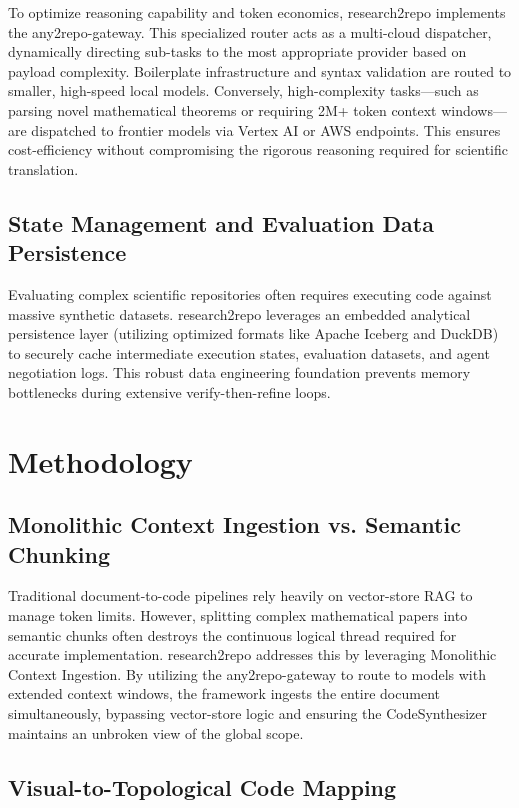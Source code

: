 \documentclass[10pt]{article}
\begin{document}
To optimize reasoning capability and token economics, research2repo implements the any2repo-gateway. This specialized router acts as a multi-cloud dispatcher, dynamically directing sub-tasks to the most appropriate provider based on payload complexity. Boilerplate infrastructure and syntax validation are routed to smaller, high-speed local models. Conversely, high-complexity tasks—such as parsing novel mathematical theorems or requiring 2M+ token context windows—are dispatched to frontier models via Vertex AI or AWS endpoints. This ensures cost-efficiency without compromising the rigorous reasoning required for scientific translation.

\subsection{State Management and Evaluation Data Persistence}

Evaluating complex scientific repositories often requires executing code against massive synthetic datasets. research2repo leverages an embedded analytical persistence layer (utilizing optimized formats like Apache Iceberg and DuckDB) to securely cache intermediate execution states, evaluation datasets, and agent negotiation logs. This robust data engineering foundation prevents memory bottlenecks during extensive verify-then-refine loops.

\section{Methodology}

\subsection{Monolithic Context Ingestion vs. Semantic Chunking}

Traditional document-to-code pipelines rely heavily on vector-store RAG to manage token limits. However, splitting complex mathematical papers into semantic chunks often destroys the continuous logical thread required for accurate implementation. research2repo addresses this by leveraging Monolithic Context Ingestion. By utilizing the any2repo-gateway to route to models with extended context windows, the framework ingests the entire document simultaneously, bypassing vector-store logic and ensuring the CodeSynthesizer maintains an unbroken view of the global scope.

\subsection{Visual-to-Topological Code Mapping}
\end{document}
